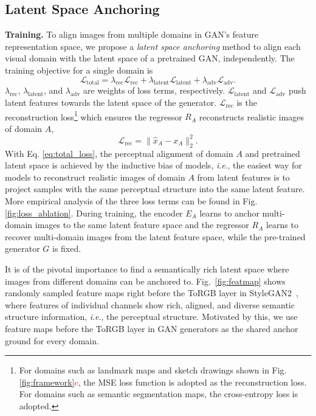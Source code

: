\documentclass[10pt,journal,compsoc]{IEEEtran}
\newcommand{\red}[1]{\textcolor{red}{#1}}
\newcommand{\ie}{\textit{i}.\textit{e}.}
\begin{document}
{\subsection{Latent Space Anchoring}
\noindent
\textbf{Training.} To align images from multiple domains in GAN's feature representation space, we propose a  \emph{latent space anchoring} method to align each visual domain with the latent space of a pretrained GAN, independently. The training objective for a single domain is 
\begin{equation}
    \mathcal{L}_\text{total} = \lambda_\text{rec}\mathcal{L}_\text{rec} + \lambda_\text{latent}\mathcal{L}_\text{latent} + \lambda_\text{adv}\mathcal{L}_\text{adv}.
    \label{eq:total_loss}
\end{equation}
$\lambda_\text{rec}$, $\lambda_\text{latent}$, and $\lambda_\text{adv}$ are weights of loss terms, respectively. 
$\mathcal{L}_\text{latent}$ and $\mathcal{L}_\text{adv}$ push latent features towards the latent space of the generator.
$\mathcal{L}_\text{rec}$ is the reconstruction loss\footnote{For domains such as landmark maps and sketch drawings shown in Fig. \ref{fig:framework}\red{c}, the MSE loss function is adopted as the reconstruction loss. For domains such as semantic segmentation maps, the cross-entropy loss is adopted.} which ensures the regressor $R_A$ reconstructs realistic images of domain $A$,
\begin{equation}
    \mathcal{L}_\text{rec} = \| \hat{x}_A -x_A \|_2^2.
    \label{eq:recon_loss}
\end{equation}
With Eq. \ref{eq:total_loss}, the perceptual alignment of domain $A$ and pretrained latent space is achieved by the inductive bias of models, \ie, the easiest way for models to reconstruct realistic images of domain $A$ from latent features is to project samples with the same perceptual structure into the same latent feature.
More empirical analysis of the three loss terms can be found in Fig. \ref{fig:loss_ablation}.
During training, the encoder $E_A$ learns to anchor multi-domain images to the same latent feature space and the regressor $R_A$ learns to recover multi-domain images from the latent feature space, while the pre-trained generator $G$ is fixed. 

It is of the pivotal importance to find a semantically rich latent space where images from different domains can be anchored to. Fig.~\ref{fig:featmap} shows randomly sampled feature maps right before the ToRGB layer in StyleGAN2~\cite{stylegan2}, where features of individual channels show rich, aligned, and diverse semantic structure information, \ie, the perceptual structure. Motivated by this, we use feature maps before the ToRGB layer in GAN generators as the shared anchor ground for every domain.

}
\end{document}
